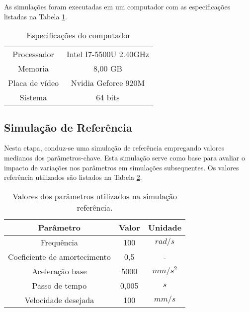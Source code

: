 As simulações foram executadas em um computador com as especificações listadas na Tabela \ref{tab:note_config}.

\begin{table}
    \begin{center}
    \caption{Especificações do computador}
    \label{tab:note_config}
    \begin{tabular}{c c}
        \hline
        Processador & Intel I7-5500U 2.40GHz \\
        Memoria & 8,00 GB \\
        Placa de vídeo & Nvidia Geforce 920M \\
        Sistema & 64 bits \\ \hline
    \end{tabular}
    \end{center}
\end{table}

\subsection{Simulação de Referência}
Nesta etapa, conduz-se uma simulação de referência empregando valores medianos dos parâmetros-chave. Esta simulação serve como base para avaliar o impacto de variações nos parâmetros em simulações subsequentes. Os valores referência utilizados são listados na Tabela \ref{tab:base_params}.

\begin{table}
    \begin{center}
    \caption{Valores dos parâmetros utilizados na simulação referência.}
    \label{tab:base_params}
    \begin{tabular}{c c c}
        Parâmetro & Valor & Unidade\\ \hline
        Frequência & 100 & $rad/s$\\
        Coeficiente de amortecimento & 0,5 & - \\
        Aceleração base & 5000 & $mm/s^2$ \\
        Passo de tempo & 0,005 & $s$ \\ 
        Velocidade desejada & 100 & $mm/s$ \\ \hline
    \end{tabular}
    \end{center}
\end{table}

